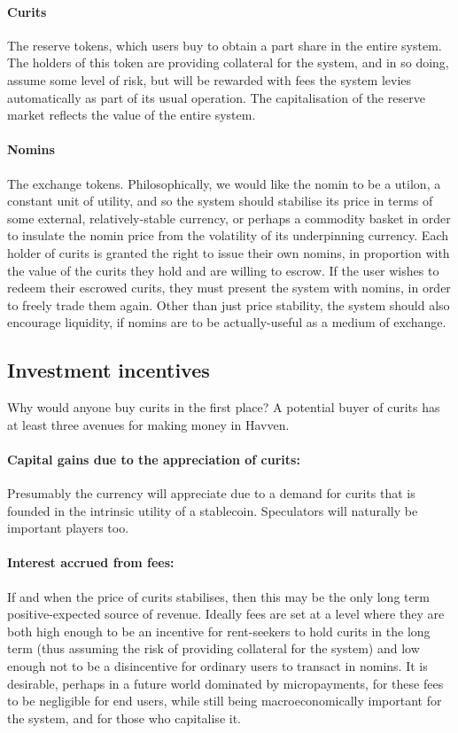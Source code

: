 \documentclass{article}
\begin{document}
\paragraph{Curits} The reserve tokens, which users buy to obtain a part share in the entire system. The holders
of this token are providing collateral for the system, and in so doing, assume some level of risk, but will
be rewarded with fees the system levies automatically as part of its usual operation. The capitalisation
of the reserve market reflects the value of the entire system.
\paragraph{Nomins} The exchange tokens. Philosophically, we would like the nomin to be a utilon, a constant
unit of utility, and so the system should stabilise its price in terms of some external, relatively-stable
currency, or perhaps a commodity basket in order to insulate the nomin price from the volatility of its 
underpinning currency. Each holder of curits is granted the right to issue their own nomins, in proportion
with the value of the curits they hold and are willing to escrow. If the user wishes to redeem their escrowed curits,
they must present the system with nomins, in order to freely trade them again. Other than just price stability,
the system should also encourage liquidity, if nomins are to be actually-useful as a medium of exchange.


\pagebreak
\subsection{Investment incentives}
Why would anyone buy curits in the first place? A potential buyer of curits has at least three avenues for making
money in Havven.

\paragraph{Capital gains due to the appreciation of curits:}
Presumably the currency will appreciate due to a demand for curits that is founded in the intrinsic
utility of a stablecoin. Speculators will naturally be important players too.

\paragraph{Interest accrued from fees:}
If and when the price of curits stabilises, then this may be the only long term positive-expected
source of revenue. Ideally fees are set at a level where they are both high enough to be an incentive
for rent-seekers to hold curits in the long term (thus assuming the risk of providing collateral for
the system) and low enough not to be a disincentive for ordinary users to transact in nomins.
It is desirable, perhaps in a future world dominated by micropayments, for these fees to be
negligible for end users, while still being macroeconomically important for the system, and for those
who capitalise it.
\end{document}
